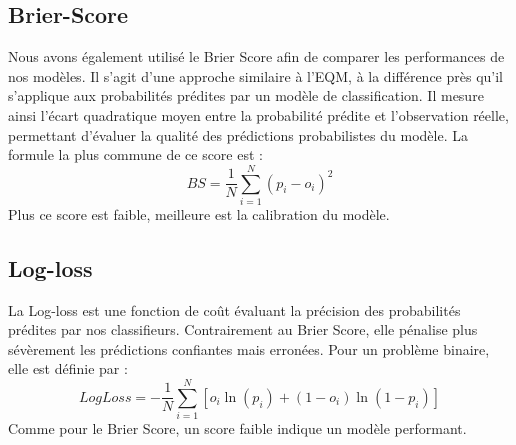 \subsection{Brier-Score}
\label{sec:BS}
Nous avons également utilisé le Brier Score afin de comparer les performances 
de nos modèles. Il s'agit d'une approche similaire à l'EQM, à la différence près 
qu'il s'applique aux probabilités prédites par un modèle de classification. Il mesure 
ainsi l'écart quadratique moyen entre la probabilité prédite et l'observation réelle, 
permettant d'évaluer la qualité des prédictions probabilistes du modèle. La formule 
la plus commune de ce score est :
\[
BS = \frac{1}{N} \sum_{i=1}^{N} (p_i - o_i)^2
\]
Plus ce score est faible, meilleure est la calibration du modèle.


\subsection{Log-loss}
\label{sec:log-loss}

La Log-loss est une fonction de coût évaluant la précision des probabilités prédites 
par nos classifieurs. Contrairement au Brier Score, elle pénalise plus sévèrement 
les prédictions confiantes mais erronées. Pour un problème binaire, 
elle est définie par :
\[
LogLoss = - \frac{1}{N} \sum_{i=1}^{N} \left[ o_i \ln(p_i) + (1 - o_i) \ln(1 - p_i) \right]
\]
Comme pour le Brier Score, un score faible indique un modèle performant.




